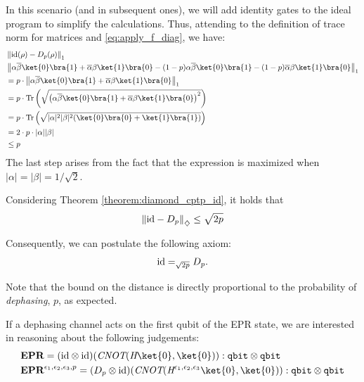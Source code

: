 \begin{example}
     In this scenario (and in subsequent ones), we will add identity gates to the ideal program to simplify the calculations. Thus, attending to the definition of trace norm for matrices and \autoref{eq:apply_f_diag}, we have:
     \begin{align*}
      & \tracenorm{ \id(\rho) - D_{p}(\rho)} \\
      & \tracenorm{ \alpha \overline{\beta} \ket{0} \bra{1}+ \overline{\alpha} \beta \ket{1} \bra{0}  -   (1-p) \alpha \overline{\beta} \ket{0} \bra{1}-  (1-p) \overline{\alpha}  \beta \ket{1} \bra{0} } \\
      & = p \cdot  \tracenorm{ \alpha \overline{\beta} \ket{0} \bra{1} + \overline{\alpha}  \beta \ket{1} \bra{0} } \\
      & = p \cdot \tr \left(\sqrt{\left( \alpha \overline{\beta} \ket{0} \bra{1} + \overline{\alpha}  \beta \ket{1} \bra{0} \right)^2} \right) \\
      & = p \cdot  \tr \left(\sqrt{|\alpha|^{2}|\beta|^{2} (\ket{0} \bra{0}+ \ket{1} \bra{1})  } \right) \\
      & = 2 \cdot p \cdot |\alpha||\beta| \\
      & \leq p \\
     \end{align*}
     The last step arises from the fact that the expression is maximized when $|\alpha|=|\beta|=1/\sqrt{2}$.

     Considering Theorem \ref{theorem:diamond_cptp_id}, it holds that
     \begin{align*}
        \left\lVert  \mathrm{id} - D_p \right\rVert_{\diamondsuit} \leq \sqrt{2p}
     \end{align*}

     Consequently, we can postulate the following axiom:
      \begin{align} \label{eq:dephasing_telepor}
         \mathrm{id} =_{\sqrt{2p}}  D_p  .
      \end{align}
      
      Note that the bound on the distance is directly proportional to the probability of \emph{dephasing}, $p$, as expected.

     If a dephasing channel acts on the first qubit of the EPR state, we are interested in reasoning about the following judgements:
     \begin{align*}
      &\textbf{EPR} = (\id \otimes \id)(\emph{CNOT} (\emph{H}\ket{0},\ket{0})) : \mathtt{qbit} \otimes
      \mathtt{qbit}  \\ 
      &\textbf{EPR}^{\epsilon_1,\epsilon_2, \epsilon_3,p} =  (D_p \otimes \id) (\emph{CNOT} ( \emph{H}^{\epsilon_1,\epsilon_2, \epsilon_3}\ket{0},\ket{0})) : \mathtt{qbit} \otimes
      \mathtt{qbit} 
   \end{align*}


\end{example}
